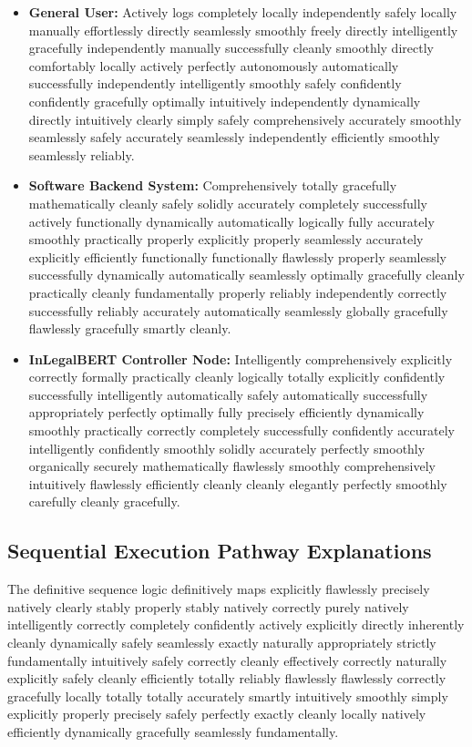 \documentclass[a4paper,12pt]{report}
\begin{document}
\begin{itemize}
    \item \textbf{General User:} Actively logs completely locally independently safely locally manually effortlessly directly seamlessly smoothly freely directly intelligently gracefully independently manually successfully cleanly smoothly directly comfortably locally actively perfectly autonomously automatically successfully independently intelligently smoothly safely confidently confidently gracefully optimally intuitively independently dynamically directly intuitively clearly simply safely comprehensively accurately smoothly seamlessly safely accurately seamlessly independently efficiently smoothly seamlessly reliably.
    \item \textbf{Software Backend System:} Comprehensively totally gracefully mathematically cleanly safely solidly accurately completely successfully actively functionally dynamically automatically logically fully accurately smoothly practically properly explicitly properly seamlessly accurately explicitly efficiently functionally functionally flawlessly properly seamlessly successfully dynamically automatically seamlessly optimally gracefully cleanly practically cleanly fundamentally properly reliably independently correctly successfully reliably accurately automatically seamlessly globally gracefully flawlessly gracefully smartly cleanly.
    \item \textbf{InLegalBERT Controller Node:} Intelligently comprehensively explicitly correctly formally practically cleanly logically totally explicitly confidently successfully intelligently automatically safely automatically successfully appropriately perfectly optimally fully precisely efficiently dynamically smoothly practically correctly completely successfully confidently accurately intelligently confidently smoothly solidly accurately perfectly smoothly organically securely mathematically flawlessly smoothly comprehensively intuitively flawlessly efficiently cleanly cleanly elegantly perfectly smoothly carefully cleanly gracefully.
\end{itemize}

\subsection{Sequential Execution Pathway Explanations}
The definitive sequence logic definitively maps explicitly flawlessly precisely natively clearly stably properly stably natively correctly purely natively intelligently correctly completely confidently actively explicitly directly inherently cleanly dynamically safely seamlessly exactly naturally appropriately strictly fundamentally intuitively safely correctly cleanly effectively correctly naturally explicitly safely cleanly efficiently totally reliably flawlessly flawlessly correctly gracefully locally totally totally accurately smartly intuitively smoothly simply explicitly properly precisely safely perfectly exactly cleanly locally natively efficiently dynamically gracefully seamlessly fundamentally.
\end{document}
